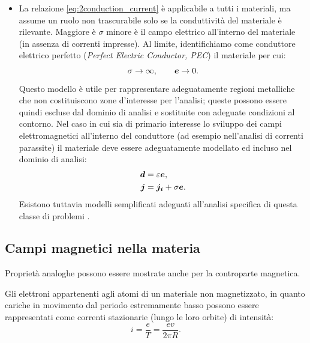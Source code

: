 \begin{itemize}
In questo caso si può scrivere:
\begin{equation}
\begin{split}
\label{eq:2costel}
\T{d} &= \left[\varepsilon_0+ \chi_e\left(\T{e}\right)\right]\T{e} \\
      &= \varepsilon\T{e}.
\end{split}
\end{equation}
\item[\textit{Conduttori}] La relazione \eqref{eq:2conduction_current} è applicabile a tutti i materiali, ma assume un ruolo non trascurabile solo se la conduttività del materiale è rilevante. Maggiore è $\sigma$ minore è il campo elettrico all'interno del materiale (in assenza di correnti impresse).
Al limite, identifichiamo come conduttore elettrico perfetto (\textit{Perfect Electric Conductor, PEC}) il materiale per cui:
\begin{equation}
\label{eq:2pec}
\sigma \rightarrow \infty,\qquad \boldsymbol{e}\rightarrow 0.
\end{equation}
Questo modello è utile per rappresentare adeguatamente regioni metalliche che non costituiscono zone d'interesse per l'analisi; queste possono essere quindi escluse dal dominio di analisi e sostituite con adeguate condizioni al contorno. 
Nel caso in cui sia di primario interesse lo sviluppo dei campi elettromagnetici all'interno del conduttore (ad esempio nell'analisi di correnti parassite) il materiale deve essere adeguatamente modellato ed incluso nel dominio di analisi: 
\begin{align}
\label{eq:2pec2}
\boldsymbol{d} &= \varepsilon\boldsymbol{e},\\
\boldsymbol{j} &= \boldsymbol{j_i}+\sigma\boldsymbol{e}.
\end{align}
Esistono tuttavia modelli semplificati adeguati all'analisi specifica di questa classe di problemi \citep{zaglmayr_high_2006}.
\end{itemize}
\subsection{Campi magnetici nella materia}
Proprietà analoghe possono essere mostrate anche per la controparte magnetica.

Gli elettroni appartenenti agli atomi di un materiale non magnetizzato, in quanto cariche in movimento dal periodo estremamente basso possono essere rappresentati come correnti stazionarie (lungo le loro orbite) di intensità:
\begin{equation}
\label{eq:2current1}
i=\frac{e}{T}=\frac{e v}{2 \pi R}.
\end{equation}

